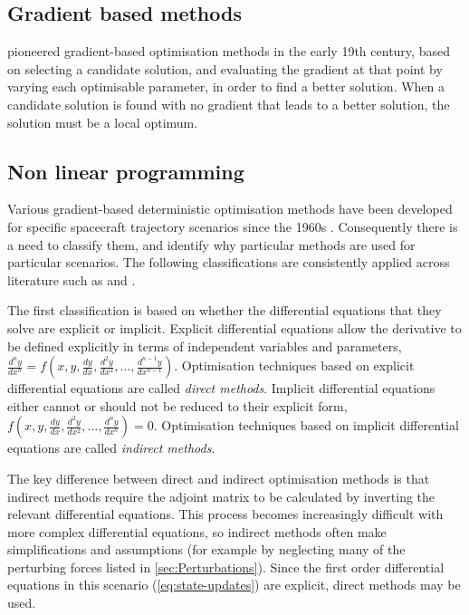 \subsection{Gradient based methods}

\textcite{Gauss1827} pioneered gradient-based optimisation methods in the early 19th century, based on selecting a candidate solution, and evaluating the gradient at that point by varying each optimisable parameter, in order to find a better solution. When a candidate solution is found with no gradient that leads to a better solution, the solution must be a local optimum.

\subsection{Non linear programming}

Various gradient-based deterministic optimisation methods have been developed for specific spacecraft trajectory scenarios since the 1960s \parencite{Betts1998}. Consequently there is a need to classify them, and identify why particular methods are used for particular scenarios. The following classifications are consistently applied across literature such as \textcite{Betts1998} and \textcite{ASTOS_guide}.

The first classification is based on whether the differential equations that they solve are explicit or implicit.
Explicit differential equations allow the derivative to be defined explicitly in terms of independent variables and parameters, $\frac{d^ny}{dx^n}=f(x,y,\frac{dy}{dx},\frac{d^2y}{dx^2},\dots,\frac{d^{n-1}y}{dx^{n-1}})$. Optimisation techniques based on explicit differential equations are called \emph{direct methods}. Implicit differential equations either cannot or should not be reduced to their explicit form, $f(x,y,\frac{dy}{dx},\frac{d^2y}{dx^2},\dots,\frac{d^{n}y}{dx^{n}})=0$. Optimisation techniques based on implicit differential equations are called \emph{indirect methods}.

The key difference between direct and indirect optimisation methods is that indirect methods require the adjoint matrix to be calculated by inverting the relevant differential equations. This process becomes increasingly difficult with more complex differential equations, so indirect methods often make simplifications and assumptions (for example by neglecting many of the perturbing forces listed in \autoref{sec:Perturbations}). Since the first order differential equations in this scenario (\autoref{eq:state-updates}) are explicit, direct methods may be used.

